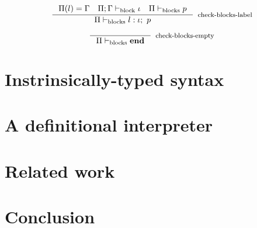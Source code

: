 \documentclass[sigconf]{acmart}
\theoremstyle{definition}
\begin{document}
\begin{equation}
\inference{\Pi(l)=\Gamma~~~\Pi;\Gamma\vdash_{\text{block}} \iota~~~\Pi\vdash_{\text{blocks}} p}
          {\Pi\vdash_{\text{blocks}} l: \iota;~p}[check-blocks-label]
\end{equation}

\begin{equation}
\inference{}
          {\Pi\vdash_{\text{blocks}} \textbf{end}}[check-blocks-empty]
\end{equation}

\section{Instrinsically-typed syntax}\label{sec:typing}

\section{A definitional interpreter}\label{sec:semantics}

\section{Related work}\label{sec:related}

\section{Conclusion}\label{sec:conclusion}





\end{document}
